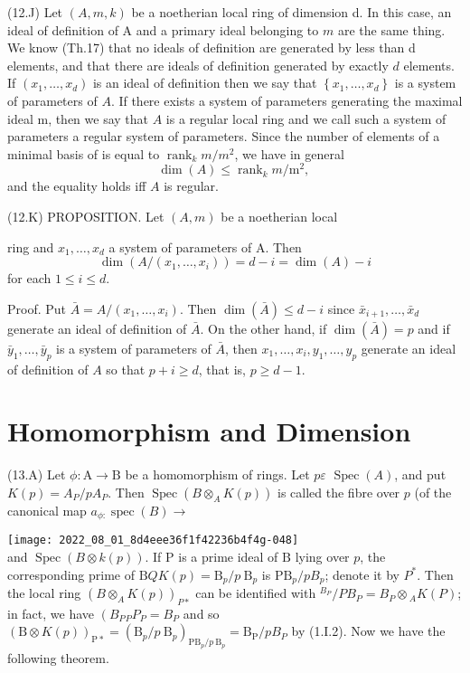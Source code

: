 (12.J) Let $(A, m, k)$ be a noetherian local ring of dimension d. In this case, an ideal of definition of A and a primary ideal belonging to $m$ are the same thing. We know (Th.17) that no ideals of definition are generated by less than d elements, and that there are ideals of definition generated by exactly $d$ elements. If $\left(x_{1}, \ldots, x_{d}\right)$ is an ideal of definition then we say that $\left\{x_{1}, \ldots, x_{d}\right\}$ is a system of parameters of $A$. If there exists a system of parameters generating the maximal ideal $\mathrm{m}$, then we say that $A$ is a regular local ring and we call such a system of parameters a regular system of parameters. Since the number of elements of a minimal basis of is equal to $\operatorname{rank}_{k} m / m^{2}$, we have in general
$$
\operatorname{dim}(A) \leq \operatorname{rank}_{k} m / \mathrm{m}^{2} \text {, }
$$
and the equality holds iff $A$ is regular.

(12.K) PROPOSITION. Let $(A, m)$ be a noetherian local

ring and $x_{1}, \ldots, x_{d}$ a system of parameters of A. Then
$$
\operatorname{dim}\left(A /\left(x_{1}, \ldots, x_{i}\right)\right)=d-i=\operatorname{dim}(A)-i
$$
for each $1 \leqslant i \leqslant d$.

Proof. Put $\bar{A}=A /\left(x_{1}, \ldots, x_{i}\right)$. Then $\operatorname{dim}(\bar{A}) \leqslant d-i$ since $\bar{x}_{i+1}, \ldots, \bar{x}_{d}$ generate an ideal of definition of $\bar{A}$. On the other hand, if $\operatorname{dim}(\bar{A})=p$ and if $\bar{y}_{1}, \ldots, \bar{y}_{p}$ is a system of parameters of $\bar{A}$, then $x_{1}, \ldots, x_{i}, y_{1}, \ldots, y_{p}$ generate an ideal of definition of $A$ so that $p+i \geqslant d$, that is, $p \geqslant d-1$.

\section{Homomorphism and Dimension}
(13.A) Let $\phi: \mathrm{A} \rightarrow \mathrm{B}$ be a homomorphism of rings. Let $p \varepsilon$ $\operatorname{Spec}(A)$, and put $K(p)=A_{P} / p A_{P}$. Then $\operatorname{Spec}\left(B \otimes_{A} K(p)\right)$ is called the fibre over $p$ (of the canonical map $a_{\phi:} \operatorname{spec}(B) \rightarrow$

\texttt{[image: 2022\_08\_01\_8d4eee36f1f42236b4f4g-048]}\\
and $\operatorname{Spec}(B \otimes k(p))$. If $\mathrm{P}$ is a prime ideal of $\mathrm{B}$ lying over $p$, the corresponding prime of $\mathrm{B} Q K(p)=\mathrm{B}_{p} / p \mathrm{~B}_{p}$ is $\mathrm{PB}_{p} / p B_{p}$; denote it by $P^{*}$. Then the local ring $\left(B \otimes_{A} K(p)\right)_{P *}$ can be identified with ${ }^{B_{P}} / P B_{P}=B_{P} \otimes{ }_{A} K(P)$; in fact, we have $\left(B_{P}{ }_{P} P_{P}=B_{P}\right.$ and so $(\mathrm{B} \otimes K(p))_{\mathrm{P} *}=\left(\mathrm{B}_{p} / p \mathrm{~B}_{p}\right)_{\mathrm{PB}_{p} / p \mathrm{~B}_{p}}=\mathrm{B}_{\mathrm{P}} / p B_{P}$ by (1.I.2). Now we have the following theorem.

